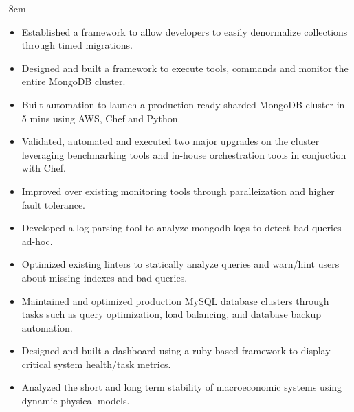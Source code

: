 \documentclass[10pt,a4paper,academicons]{altacv}
\begin{document}

\begin{adjustwidth}{}{-8cm}
\makecvheader
\end{adjustwidth}


\begin{itemize}
\item Established a framework to allow developers to easily denormalize collections through timed migrations.
\item Designed and built a framework to execute tools, commands and monitor the entire MongoDB cluster.
\item Built automation to launch a production ready sharded MongoDB cluster in 5 mins using AWS, Chef and Python.
\item Validated, automated and executed two major upgrades on the cluster leveraging benchmarking tools and in-house orchestration tools in conjuction with Chef.
\item Improved over existing monitoring tools through paralleization and higher fault tolerance.
\item Developed a log parsing tool to analyze mongodb logs to detect bad queries ad-hoc.
\item Optimized existing linters to statically analyze queries and warn/hint users about missing indexes and bad queries. 
\end{itemize}

\divider

\begin{itemize}
\item Maintained and optimized production MySQL database clusters through tasks such as query optimization, load balancing, and database backup automation.
\item Designed and built a dashboard using a ruby based framework to display critical system health/task metrics.
\end{itemize}

\divider

\begin{itemize}
\item Analyzed the short and long term stability of macroeconomic systems using dynamic physical models.
\end{itemize}
\end{document}
